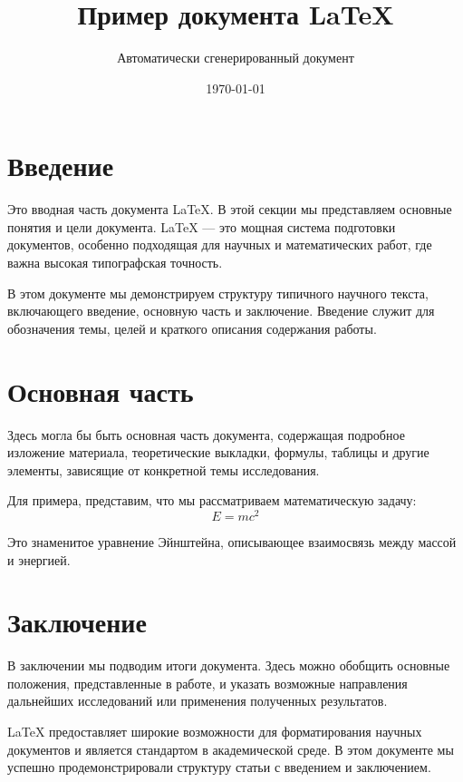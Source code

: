 \documentclass{article}
\title{Пример документа LaTeX}
\author{Автоматически сгенерированный документ}
\date{\today}
\begin{document}
\maketitle

\section{Введение}
Это вводная часть документа LaTeX. В этой секции мы представляем основные понятия и цели документа. LaTeX --- это мощная система подготовки документов, особенно подходящая для научных и математических работ, где важна высокая типографская точность. 

В этом документе мы демонстрируем структуру типичного научного текста, включающего введение, основную часть и заключение. Введение служит для обозначения темы, целей и краткого описания содержания работы.

\section{Основная часть}
Здесь могла бы быть основная часть документа, содержащая подробное изложение материала, теоретические выкладки, формулы, таблицы и другие элементы, зависящие от конкретной темы исследования. 

Для примера, представим, что мы рассматриваем математическую задачу:
\begin{equation}
    E = mc^2
\end{equation}

Это знаменитое уравнение Эйнштейна, описывающее взаимосвязь между массой и энергией.

\section{Заключение}
В заключении мы подводим итоги документа. Здесь можно обобщить основные положения, представленные в работе, и указать возможные направления дальнейших исследований или применения полученных результатов.

LaTeX предоставляет широкие возможности для форматирования научных документов и является стандартом в академической среде. В этом документе мы успешно продемонстрировали структуру статьи с введением и заключением.
\end{document}
